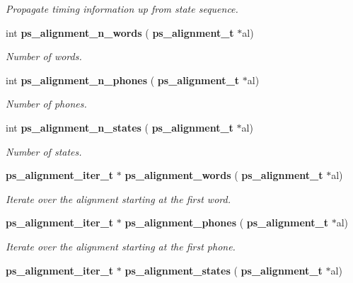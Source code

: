 \begin{DoxyCompactItemize}
\begin{DoxyCompactList}\small\item\em Propagate timing information up from state sequence. \end{DoxyCompactList}\item 
\mbox{\label{ps__alignment_8h_a89fdf321c5a6ee6edeb9c2757d7509cf}} 
int \textbf{ ps\+\_\+alignment\+\_\+n\+\_\+words} (\textbf{ ps\+\_\+alignment\+\_\+t} $\ast$al)
\begin{DoxyCompactList}\small\item\em Number of words. \end{DoxyCompactList}\item 
\mbox{\label{ps__alignment_8h_ab541dcf586611d20e84fd9ec562e7a52}} 
int \textbf{ ps\+\_\+alignment\+\_\+n\+\_\+phones} (\textbf{ ps\+\_\+alignment\+\_\+t} $\ast$al)
\begin{DoxyCompactList}\small\item\em Number of phones. \end{DoxyCompactList}\item 
\mbox{\label{ps__alignment_8h_acfed230b07c1e09fae89eeb74c468460}} 
int \textbf{ ps\+\_\+alignment\+\_\+n\+\_\+states} (\textbf{ ps\+\_\+alignment\+\_\+t} $\ast$al)
\begin{DoxyCompactList}\small\item\em Number of states. \end{DoxyCompactList}\item 
\mbox{\label{ps__alignment_8h_a8d2b39bad3a4f6018155e9101dee63f8}} 
\textbf{ ps\+\_\+alignment\+\_\+iter\+\_\+t} $\ast$ \textbf{ ps\+\_\+alignment\+\_\+words} (\textbf{ ps\+\_\+alignment\+\_\+t} $\ast$al)
\begin{DoxyCompactList}\small\item\em Iterate over the alignment starting at the first word. \end{DoxyCompactList}\item 
\mbox{\label{ps__alignment_8h_a5d4fe03d7eef6a96ca8f1b21b9fd3a33}} 
\textbf{ ps\+\_\+alignment\+\_\+iter\+\_\+t} $\ast$ \textbf{ ps\+\_\+alignment\+\_\+phones} (\textbf{ ps\+\_\+alignment\+\_\+t} $\ast$al)
\begin{DoxyCompactList}\small\item\em Iterate over the alignment starting at the first phone. \end{DoxyCompactList}\item 
\mbox{\label{ps__alignment_8h_a8c6ba334f7dcf512f8485ca7a0b2d2c0}} 
\textbf{ ps\+\_\+alignment\+\_\+iter\+\_\+t} $\ast$ \textbf{ ps\+\_\+alignment\+\_\+states} (\textbf{ ps\+\_\+alignment\+\_\+t} $\ast$al)

\end{DoxyCompactItemize}
